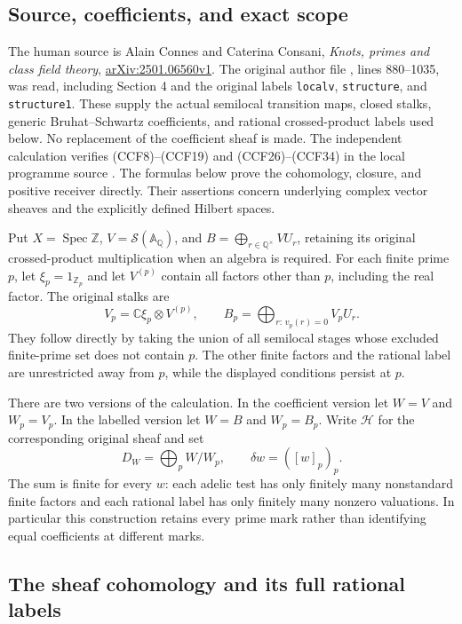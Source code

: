 \documentclass[11pt,a4paper]{article}
\theoremstyle{definition}\newtheorem{definition}[theorem]{Definition}
\newcommand{\Z}{\mathbb Z}\newcommand{\Q}{\mathbb Q}
\newcommand{\C}{\mathbb C}\newcommand{\R}{\mathbb R}
\newcommand{\Spec}{\operatorname{Spec}}\newcommand{\SpecMon}{\operatorname{Spec}_{\mathrm{mon}}}
\begin{document}
\subsection{Source, coefficients, and exact scope}

The human source is Alain Connes and Caterina Consani,
\emph{Knots, primes and class field theory},
\href{https://arxiv.org/abs/2501.06560v1}{arXiv:2501.06560v1}.
The original author file , lines 880--1035,
was read, including Section 4 and the original labels
\texttt{localv}, \texttt{structure}, and \texttt{structure1}.
These supply the actual semilocal transition maps, closed stalks,
generic Bruhat--Schwartz coefficients, and rational crossed-product
labels used below. No replacement of the coefficient sheaf is made.
The independent calculation verifies (CCF8)--(CCF19) and
(CCF26)--(CCF34) in the local programme source
.
The formulas below prove the cohomology, closure, and positive
receiver directly. Their assertions concern underlying complex
vector sheaves and the explicitly defined Hilbert spaces.

Put $X=\Spec\Z$, $V=\mathcal S(\mathbb A_\Q)$, and
$B=\bigoplus_{r\in\Q^\times}VU_r$, retaining its original
crossed-product multiplication when an algebra is required.
For each finite prime $p$, let $\xi_p=1_{\Z_p}$ and let
$V^{(p)}$ contain all factors other than $p$, including the real
factor. The original stalks are
\[
 V_p=\C\xi_p\otimes V^{(p)},\qquad
 B_p=\bigoplus_{r:\,v_p(r)=0}V_pU_r.
 \tag{MQ1}\label{mq:eq:stalks}
\]
They follow directly by taking the union of all semilocal stages
whose excluded finite-prime set does not contain $p$. The other
finite factors and the rational label are unrestricted away from
$p$, while the displayed conditions persist at $p$.

There are two versions of the calculation. In the coefficient
version let $W=V$ and $W_p=V_p$. In the labelled version let
$W=B$ and $W_p=B_p$. Write $\mathcal H$ for the corresponding
original sheaf and set
\[
 D_W=\bigoplus_p W/W_p,\qquad
 \delta w=([w]_p)_p.
 \tag{MQ2}\label{mq:eq:marked}
\]
The sum is finite for every $w$: each adelic test has only finitely
many nonstandard finite factors and each rational label has only
finitely many nonzero valuations. In particular this construction
retains every prime mark rather than identifying equal coefficients
at different marks.

\subsection{The sheaf cohomology and its full rational labels}
\end{document}
